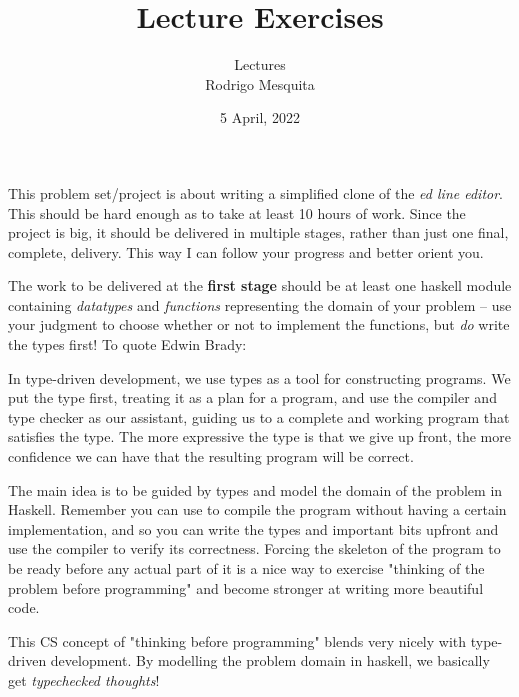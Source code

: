 \documentclass[a4paper,10pt]{article}
\title{Lecture Exercises}
\author{Lectures \\ Rodrigo Mesquita}
\date{5 April, 2022}
\begin{document}
\maketitle


This problem set/project is about writing a simplified clone of the \emph{ed
line editor}. This should be hard enough as to take at least 10 hours of work.
Since the project is big, it should be delivered in multiple stages, rather
than just one final, complete, delivery. This way I can follow your progress
and better orient you.

The work to be delivered at the \textbf{first stage} should be at least one
haskell module containing \emph{datatypes} and \emph{functions} representing
the domain of your problem -- use your judgment to choose whether or not to
implement the functions, but \emph{do} write the types first! To quote Edwin
Brady:

\begin{displayquote}
In type-driven development, we use types as a tool for constructing
programs. We put the type first, treating it as a plan for a program, and use
the compiler and type checker as our assistant, guiding us to a complete and
working program that satisfies the type. The more expressive the type is that
we give up front, the more confidence we can have that the resulting program
will be correct.
\end{displayquote}

The main idea is to be guided by types and model the domain of the problem in
Haskell. Remember you can use  to compile the program without having
a certain implementation, and so you can write the types and important bits
upfront and use the compiler to verify its correctness. Forcing the skeleton of
the program to be ready before any actual part of it is a nice way to exercise
"thinking of the problem before programming" and become stronger at writing
more beautiful code.

This CS concept of "thinking before programming" blends very nicely with
type-driven development. By modelling the problem domain in haskell, we
basically get \emph{typechecked thoughts}!
\end{document}
